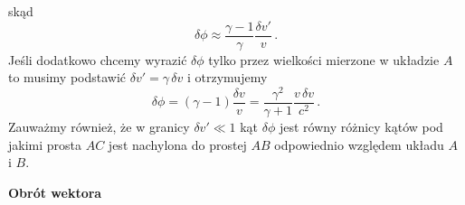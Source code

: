 \documentclass[../main.tex]{subfiles}
\begin{document}
skąd
\begin{equation*}
    \delta \phi\approx\frac{\gamma-1}{\gamma}\frac{\delta v'}{v}\,.
\end{equation*}
Jeśli dodatkowo chcemy wyrazić \(\delta\phi\) tylko przez wielkości mierzone w układzie \(A\) to musimy podstawić \(\delta v'=\gamma\,\delta v\) i otrzymujemy
\begin{equation*}
    \delta\phi=(\gamma-1)\frac{\delta v}{v}=\frac{\gamma^2}{\gamma+1}\frac{v\,\delta v}{c^2}\,.
\end{equation*}
Zauważmy również, że w granicy \(\delta v'\ll 1\) kąt \(\delta \phi\) jest równy różnicy kątów pod jakimi prosta \(AC\) jest nachylona do prostej \(AB\) odpowiednio względem układu \(A\) i \(B\).
\medskip

\noindent \textbf{Obrót wektora} 
\medskip
\end{document}
